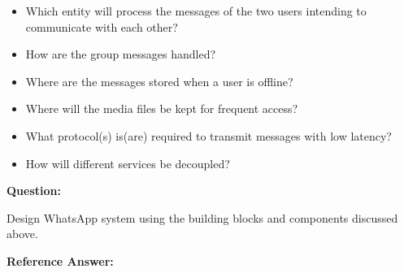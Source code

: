 \begin{itemize}
\item
Which entity will process the messages of the two users intending to communicate with each other?
\item
How are the group messages handled?
\item
Where are the messages stored when a user is offline?
\item
Where will the media files be kept for frequent access?
\item
What protocol(s) is(are) required to transmit messages with low latency?
\item
How will different services be decoupled?
\end{itemize}

\textbf{Question:}

Design WhatsApp system using the building blocks and components discussed above. 

\textbf{Reference Answer:}

